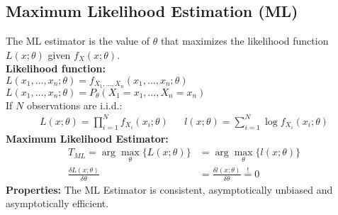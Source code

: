 \begin{mdframed}[style=eqbox]
  \subsection{Maximum Likelihood Estimation (ML)}
  The ML estimator is the value of $\theta$ that maximizes the likelihood function $L(x;\theta)$ given $f_X(x; \theta)$.\\[0.25em]
  \textbf{Likelihood function:}\\
  $L(x_1, \ldots, x_n; \theta) = f_{X_1, \ldots, X_n}(x_1, \ldots, x_n; \theta)$\\
  $L(x_1, \ldots, x_n; \theta) = P_\theta(X_1 = x_1, \ldots, X_n = x_n)$\\[0.5em]
  If $N$ observations are i.i.d.:
  \vspace*{-4pt}
  \begin{align*}
    L(x;\theta) = \prod_{i=1}^N f_{X_i}(x_i; \theta) && l(x;\theta) = \sum_{i=1}^N \log f_{X_i}(x_i; \theta)
  \end{align*}
  \textbf{Maximum Likelihood Estimator:}
  \vspace*{-4pt}
  \begin{align*}
    T_{ML} = \arg \max_\theta \{ L(x;\theta) \} &= \arg\max_\theta \{ l(x;\theta)\}\\
    \frac{\delta L(x;\theta)}{\delta \theta} &= \frac{\delta l(x;\theta)}{\delta \theta} \overset{!}{ =} 0
  \end{align*}
  \textbf{Properties:}
  The ML Estimator is consistent, asymptotically unbiased and asymptotically efficient.
\end{mdframed}
\newpage
